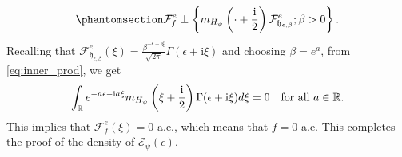 \documentclass[12pt]{amsart}
\newcommand{\hlabel}{\phantomsection\label}
\numberwithin{equation}{section}
\newcommand{\bb}{\mathbb}
\newcommand{\cc}{\mathcal}
\newcommand{\mf}{\mathfrak}
\newcommand{\Hpsi}{H_\psi}
\newcommand{\fouho}{\cc{F}^{e}}
\newcommand{\D}{\mathbf{D}}
\newcommand{\eps}{\epsilon}
\newcommand{\heb}{\mf{h}_{\eps,\beta}}
\renewcommand{\i}{\mathrm{i}}
\theoremstyle{definition}
\theoremstyle{assump}
\theoremstyle{remark}
\begin{document}
{\begin{align}\hlabel{eq:inner_prod}
	\fouho _{f}\perp \left\{m_{\Hpsi}\left(\cdot+\frac{{\rm{i}}}{2}\right)\fouho_{\heb}; \beta>0\right\}.
\end{align}
Recalling that $\fouho_{\heb}(\xi)=\frac{\beta^{-\eps-\i\xi}}{\sqrt{2\pi}}\Gamma(\eps+\i\xi)$ and choosing $\beta=e^a$, from \eqref{eq:inner_prod}, we get
\begin{align*}
	\int_{\bb{R}}e^{-a\eps-{\rm{i}} a\xi}m_{\Hpsi}\left(\xi+\frac{{\rm{i}}}{2}\right)\Gamma(\eps+\i\xi)d\xi=0 \ \ \mbox{ for all }  a\in\bb{R}.
\end{align*}
This implies that $\fouho_{f}(\xi)=0$ a.e., which means that $f=0$ a.e. This completes the proof of the density of $\cc{E}_\psi(\eps)$.


}
\end{document}
